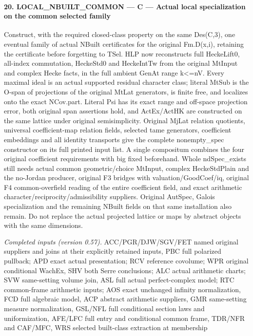 \paragraph{20. LOCAL\_\allowbreak NBUILT\_\allowbreak COMMON — C — Actual local specialization on the common selected family}

Construct, with the required closed-class property on the same Des(C,3), one eventual family of actual NBuilt certificates for the original Fm.D(x,i), retaining the certificate before forgetting to TSel. HLP now reconstructs full HeckeLift0, all-index commutation, HeckeStd0 and HeckeIntTw from the original MtInput and complex Hecke facts, in the full ambient GenAt range k<=nV. Every maximal ideal is an actual supported residual character class; literal MtSub is the O-span of projections of the original MtLat generators, is finite free, and localizes onto the exact NCov.part. Literal Psi has its exact range and off-space projection error, both original span assertions hold, and ActEx/ActHK are constructed on the same lattice under original semisimplicity. Original MjLat relation quotients, universal coefficient-map relation fields, selected tame generators, coefficient embeddings and all identity transports give the complete nonempty\_\allowbreak spec constructor on its full printed input list. A single compositum combines the four original coefficient requirements with big fixed beforehand. Whole ndSpec\_\allowbreak exists still needs actual common geometric/choice MtInput, complex HeckeStdPlain and the no-Jordan producer, original F3 bridges with valuation/GoodCoef/iq, original F4 common-overfield reading of the entire coefficient field, and exact arithmetic character/reciprocity/admissibility suppliers. Original AutSpec, Galois specialization and the remaining NBuilt fields on that same installation also remain. Do not replace the actual projected lattice or maps by abstract objects with the same dimensions.

\emph{Completed inputs (version 0.57).} ACC/PGR/DJW/SGV/FET named original suppliers and joins at their explicitly retained inputs, PBC full polarized pullback; APD exact actual presentation; RCV reference covolume; WPR original conditional WachEx, SHV both Serre conclusions; ALC actual arithmetic charts; SVW same-setting volume join, ASL full actual perfect-complex model; RTC common-frame arithmetic inputs; AOS exact unchanged infinity normalization, FCD full algebraic model, ACP abstract arithmetic suppliers, GMR same-setting measure normalization, GSL/NFL full conditional section laws and uniformization, AFE/LFC full entry and conditional common frame, TDR/NFR and CAF/MFC, WRS selected built-class extraction at membership

